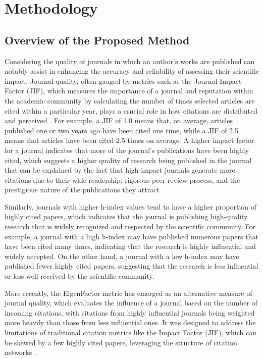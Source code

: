 \chapter{Methodology}
\label{ch:methods}

\section{Overview of the Proposed Method}

Considering the quality of journals in which an author's works are published
can notably assist in enhancing the accuracy and reliability of assessing their
scientific impact. Journal quality, often gauged by metrics such as the Journal
Impact Factor (JIF), which measures the importance of a journal and reputation
within the academic community by calculating the number of times selected
articles are cited within a particular year, plays a crucial role in how
citations are distributed and perceived \cite{garfield1999journal,
      garfield2006history}. For example, a JIF of 1.0 means that, on average,
articles published one or two years ago have been cited one time, while a JIF
of 2.5 means that articles have been cited 2.5 times on average. A higher
impact factor for a journal indicates that more of the journal's publications
have been highly cited, which suggests a higher quality of research being
published in the journal that can be explained by the fact that high-impact
journals generate more citations due to their wide readership, rigorous
peer-review process, and the prestigious nature of the publications they
attract \cite{garfield2006history}.

Similarly, journals with higher h-index values tend to have a higher proportion
of highly cited papers, which indicates that the journal is publishing
high-quality research that is widely recognized and respected by the scientific
community. For example, a journal with a high h-index may have published
numerous papers that have been cited many times, indicating that the research
is highly influential and widely accepted. On the other hand, a journal with a
low h-index may have published fewer highly cited papers, suggesting that the
research is less influential or less well-received by the scientific community.

More recently, the EigenFactor metric has emerged as an alternative measure of
journal quality, which evaluates the influence of a journal based on the number
of incoming citations, with citations from highly influential journals being
weighted more heavily than those from less influential ones. It was designed to
address the limitations of traditional citation metrics like the Impact Factor
(JIF), which can be skewed by a few highly cited papers, leveraging the
structure of citation networks \cite{bergstrom2007eigenfactor}.

